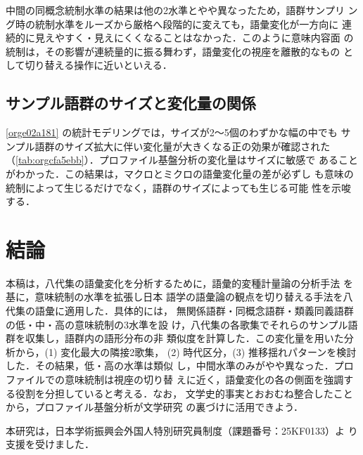 \documentclass[submit]{ipsj}
\renewcommand{\ref}{\cref}
\begin{document}
中間の同概念統制水準の結果は他の2水準とやや異なったため，語群サンプリ
ング時の統制水準をルーズから厳格へ段階的に変えても，語彙変化が一方向に
連続的に見えやすく・見えにくくなることはなかった．このように意味内容面
の統制は，その影響が連続量的に振る舞わず，語彙変化の視座を離散的なもの
として切り替える操作に近いといえる．
\subsection{サンプル語群のサイズと変化量の関係\label{orgaf94164}}
\label{sec:org1b8cee3}
\ref{orge02a181} の統計モデリングでは，サイズが2〜5個のわずかな幅の中でも
サンプル語群のサイズ拡大に伴い変化量が大きくなる正の効果が確認された
（\ref{tab:orgcfa5ebb}）．プロファイル基盤分析の変化量はサイズに敏感で
あることがわかった．この結果は，マクロとミクロの語彙変化量の差が必ずし
も意味の統制によって生じるだけでなく，語群のサイズによっても生じる可能
性を示唆する．
\section{結論\label{orge0c3a2e}}
\label{sec:orge17d9d9}
本稿は，八代集の語彙変化を分析するために，語彙的変種計量論の分析手法
\cite{Speelman2003Profilebased} を基に，意味統制の水準を拡張し日本
語学の語彙論の観点を切り替える手法を八代集の語彙に適用した．具体的には，
無関係語群・同概念語群・類義同義語群の低・中・高の意味統制の3水準を設
け，八代集の各歌集でそれらのサンプル語群を収集し，語群内の語形分布の非
類似度を計算した．この変化量を用いた分析から，(1) 変化最大の隣接2歌集，
(2) 時代区分，(3) 推移揺れパターンを検討した．その結果，低・高の水準は類似
し，中間水準のみがやや異なった．プロファイルでの意味統制は視座の切り替
えに近く，語彙変化の各の側面を強調する役割を分担していると考える．なお，
文学史的事実とおおむね整合したことから，プロファイル基盤分析が文学研究
の裏づけに活用できよう．

\begin{acknowledgment}
  本研究は，日本学術振興会外国人特別研究員制度（課題番号：25KF0133）よ
  り支援を受けました．
\end{acknowledgment}


\end{document}
